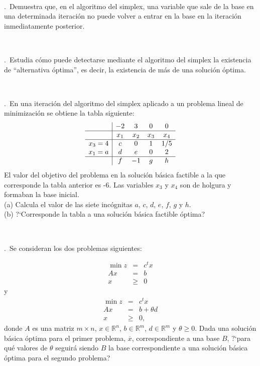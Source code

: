 \documentclass[11pt,a4paper,twoside]{article}
\newcounter{problem} \setcounter{problem}{1}
\newcommand{\ex}{\noindent {\sf \bf \theproblem}\addtocounter{problem}{1}.\ }
\begin{document}
\

\ex Demuestra que, en el algoritmo del simplex, una variable que sale de la base en una determinada iteración no puede volver a entrar en la base en la iteración inmediatamente posterior.


\

\ex Estudia c\'omo puede detectarse mediante el algoritmo del simplex
la existencia de ``alternativa \'optima'', es decir, la existencia
de m\'as de una soluci\'on \'optima.




\


\ex En una iteraci\'on del algoritmo del simplex aplicado a un
problema lineal de minimizaci\'on se obtiene la
tabla siguiente:
\[
\begin{array}{c|cccc}
 & -2 & 3 & 0 & 0 \\ \hline
 & x_1 & x_2 & x_3 & x_4 \\ \hline
x_3=4 & c & 0 & 1 & 1/5 \\
x_1=a & d & e & 0 & 2 \\ \hline
 & f & -1 & g & h
\end{array}
\]
El valor del objetivo del problema en la soluci\'on
b\'asica factible a la que corresponde la tabla anterior es
-6. Las variables $x_3$ y $x_4$ son de holgura y formaban
la base inicial.\\
(a) Calcula el valor de las siete inc\'ognitas $a$, $c$,
$d$, $e$, $f$, $g$ y $h$.\\
(b) ?`Corresponde la tabla a una soluci\'on b\'asica factible
\'optima? %


\

\ex Se consideran los dos problemas siguientes:

\begin{eqnarray*}
 \min z &=& c^tx \\
 Ax &=& b \\
x & \geq & 0
\end{eqnarray*} 
y
\begin{eqnarray*}
 \min z &=& c^tx \\
 Ax &=& b+\theta d \\
  x & \geq & 0,
\end{eqnarray*}
donde $A$ es una matriz $m\times n$, $x\in\mathbb{R}^n$, $b\in\mathbb{R}^m$,
$d\in\mathbb{R}^m$ y $\theta\geq 0$. Dada una soluci\'on b\'asica \'optima
para el primer problema, $\overline{x}$, correspondiente a una base $B$,
 ?`para qu\'e valores de $\theta$ seguir\'a siendo $B$
la base correspondiente a una soluci\'on b\'asica \'optima para el segundo problema?
\end{document}
